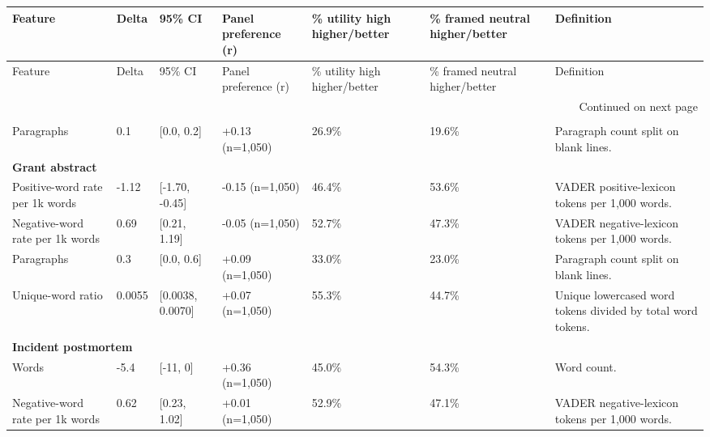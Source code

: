 \begin{longtable}{lllllll}
\toprule
Feature & Delta & 95\% CI & Panel preference (r) & \% utility high higher/better & \% framed neutral higher/better & Definition \\
\midrule
\endfirsthead
\toprule
Feature & Delta & 95\% CI & Panel preference (r) & \% utility high higher/better & \% framed neutral higher/better & Definition \\
\midrule
\endhead
\midrule
\multicolumn{7}{r}{Continued on next page} \\
\midrule
\endfoot
\bottomrule
\endlastfoot
\multicolumn{7}{l}{\textbf{Essay writing}} \\
Paragraphs & 0.1 & [0.0, 0.2] & +0.13 (n=1,050) & 26.9\% & 19.6\% & Paragraph count split on blank lines. \\
\multicolumn{7}{l}{\textbf{Grant abstract}} \\
Positive-word rate per 1k words & -1.12 & [-1.70, -0.45] & -0.15 (n=1,050) & 46.4\% & 53.6\% & VADER positive-lexicon tokens per 1,000 words. \\
Negative-word rate per 1k words & 0.69 & [0.21, 1.19] & -0.05 (n=1,050) & 52.7\% & 47.3\% & VADER negative-lexicon tokens per 1,000 words. \\
Paragraphs & 0.3 & [0.0, 0.6] & +0.09 (n=1,050) & 33.0\% & 23.0\% & Paragraph count split on blank lines. \\
Unique-word ratio & 0.0055 & [0.0038, 0.0070] & +0.07 (n=1,050) & 55.3\% & 44.7\% & Unique lowercased word tokens divided by total word tokens. \\
\multicolumn{7}{l}{\textbf{Incident postmortem}} \\
Words & -5.4 & [-11, 0] & +0.36 (n=1,050) & 45.0\% & 54.3\% & Word count. \\
Negative-word rate per 1k words & 0.62 & [0.23, 1.02] & +0.01 (n=1,050) & 52.9\% & 47.1\% & VADER negative-lexicon tokens per 1,000 words. \\
\end{longtable}
